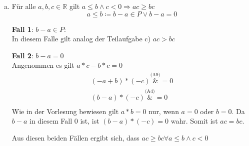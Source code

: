 \documentclass{article}
\begin{document}
\begin{enumerate}[a)]
\item Für alle $a, b, c \in \mathbb{R}$ gilt $a \leq b \land c < 0 \Rightarrow ac \geq bc$
  \[
    a \leq b \coloneqq b - a \in P \lor b - a = 0
  \]

  \begin{minipage}[t]{.45\textwidth}
    \textbf{Fall 1}: $b - a \in P$: \\
    
    In diesem Falle gilt analog der Teilaufgabe c) 
    $ac > bc$
  \end{minipage}
  \hfill
  \vrule
  \hfill
  \begin{minipage}[t]{.45\textwidth}
    \textbf{Fall 2}: $b - a = 0$ \\
    
    Angenommen es gilt $ a * c - b * c = 0$
    \begin{align*}
      (-a + b) * (-c) \overset{\text{(A9)}}&{=} 0 \\
      (b - a) * (-c) \overset{\text{(A4)}}&{=} 0 \\
    \end{align*}
    Wie in der Vorlesung bewiesen gilt $a * b = 0$ nur, wenn $a = 0$ oder $b = 0$.
    Da $b - a$ in diesem Fall $0$ ist, ist $(b - a) * (-c) = 0$ wahr.
    Somit ist $ac = bc$.
  \end{minipage}

  Aus diesen beiden Fällen ergibt sich, dass $ac \geq bc \forall a \leq b \land c < 0$ 
\end{enumerate}
\end{document}
